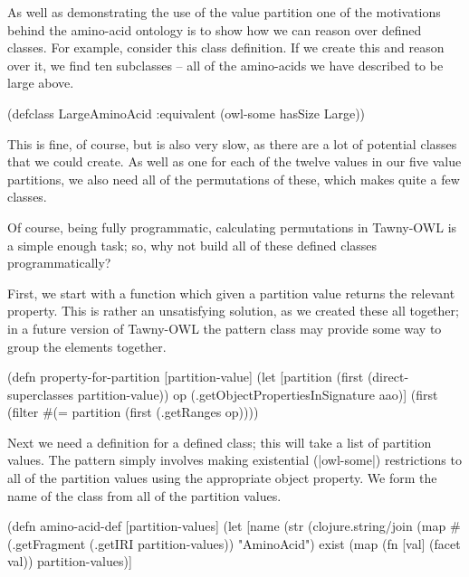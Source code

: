 As well as demonstrating the use of the value partition one of the motivations
behind the amino-acid ontology is to show how we can reason over defined
classes. For example, consider this class definition. If we create this and
reason over it, we find ten subclasses -- all of the amino-acids we have
described to be large above.

\begin{tawnyexample}
(defclass LargeAminoAcid
  :equivalent (owl-some hasSize Large))
\end{tawnyexample}

This is fine, of course, but is also very slow, as there are a lot of
potential classes that we could create. As well as one for each of the twelve
values in our five value partitions, we also need all of the permutations of
these, which makes quite a few classes.

Of course, being fully programmatic, calculating permutations in Tawny-OWL is
a simple enough task; so, why not build all of these defined classes
programmatically?

First, we start with a function which given a partition value returns the
relevant property. This is rather an unsatisfying solution, as we created
these all together; in a future version of Tawny-OWL the pattern class may
provide some way to group the elements together.

\begin{tawny}
(defn property-for-partition [partition-value]
  (let [partition
        (first (direct-superclasses partition-value))
        op
        (.getObjectPropertiesInSignature aao)]
    (first
     (filter
      #(= partition
          (first (.getRanges %
      op))))
\end{tawny}

Next we need a definition for a defined class; this will take a list of
partition values. The pattern simply involves making existential (|owl-some|)
restrictions to all of the partition values using the appropriate object
property. We form the name of the class from all of the partition values.



\begin{tawny}
(defn amino-acid-def [partition-values]
  (let [name
        (str
         (clojure.string/join
          (map
           #(.getFragment
             (.getIRI %
           partition-values))
         "AminoAcid")
        exist
        (map
         (fn [val]
           (facet val))
         partition-values)]
\end{tawny}

